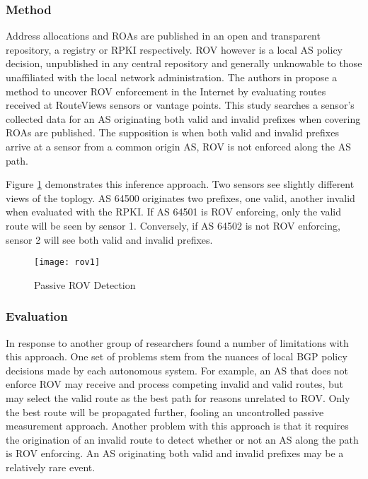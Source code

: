 \documentclass[sigconf]{acmart}
\begin{document}
\subsubsection{Method}

Address allocations and ROAs are published in an open and transparent
repository, a registry or RPKI respectively.  ROV however is a local AS
policy decision, unpublished in any central repository and generally
unknowable to those unaffiliated with the local network administration.
The authors in \cite{gilad_are_2017} propose a method to uncover ROV
enforcement in the Internet by evaluating routes received at RouteViews
sensors or vantage points.  This study searches a sensor's collected
data for an AS originating both valid and invalid prefixes when covering
ROAs are published.  The supposition is when both valid and invalid
prefixes arrive at a sensor from a common origin AS, ROV is not enforced
along the AS path.

Figure \ref{fig:rov1} demonstrates this inference approach.  Two sensors
see slightly different views of the toplogy.  AS 64500 originates two
prefixes, one valid, another invalid when evaluated with the RPKI.  If
AS 64501 is ROV enforcing, only the valid route will be seen by sensor
1.  Conversely, if AS 64502 is not ROV enforcing, sensor 2 will see both
valid and invalid prefixes.

\begin{figure}
  \centering
    \texttt{[image: rov1]}
  \caption{Passive ROV Detection}
  \label{fig:rov1}
\end{figure}

\subsubsection{Evaluation}

In response to \cite{gilad_are_2017} another group of researchers found
a number of limitations with this approach.\cite{reuter_towards_2018}
One set of problems stem from the nuances of local BGP policy decisions
made by each autonomous system.  For example, an AS that does not
enforce ROV may receive and process competing invalid and valid routes,
but may select the valid route as the best path for reasons unrelated to
ROV.  Only the best route will be propagated further, fooling an
uncontrolled passive measurement approach.  Another problem with this
approach is that it requires the origination of an invalid route to
detect whether or not an AS along the path is ROV enforcing.  An AS
originating both valid and invalid prefixes may be a relatively rare
event.
\end{document}
